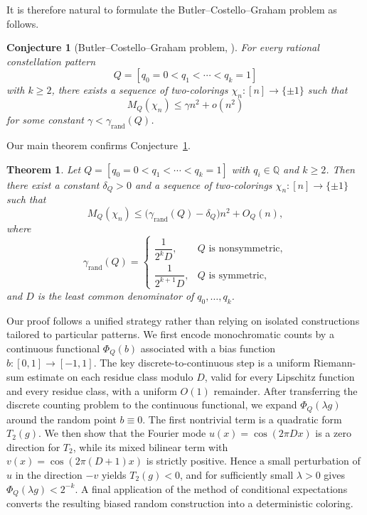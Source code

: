 \documentclass[twoside,12pt]{article}
\newcommand{\Q}{\mathbb{Q}}
\newcommand{\rand}{\mathrm{rand}}
\newcommand{\1}{\mathbf 1}
\newtheorem{theorem}{Theorem}[section]
\newtheorem{conjecture}{Conjecture}
\begin{document}
It is therefore natural to formulate the Butler--Costello--Graham problem as
follows.

\begin{conjecture}[Butler--Costello--Graham problem, \cite{BCG10}]
\label{con}
For every rational constellation pattern
\[
Q=[q_0=0<q_1<\cdots<q_k=1]
\]
with \(k\ge 2\), there exists a sequence of two-colorings
\(\chi_n:[n]\to\{\pm1\}\) such that
\[
M_Q(\chi_n)\le \gamma n^2+o(n^2)
\]
for some constant \(\gamma<\gamma_{\rand}(Q)\).
\end{conjecture}


Our main theorem confirms Conjecture~\ref{con}.

\begin{theorem}\label{thm:main}
Let \(Q=[q_0=0<q_1<\cdots<q_k=1]\) with \(q_i\in\Q\) and \(k\ge 2\).  Then
there exist a constant \(\delta_Q>0\) and a sequence of two-colorings
\(\chi_n:[n]\to\{\pm1\}\) such that
\[
M_Q(\chi_n)
\le
\bigl(\gamma_{\rand}(Q)-\delta_Q\bigr)n^2+O_Q(n),
\]
where
\[
\gamma_{\rand}(Q)=
\begin{cases}
\dfrac{1}{2^kD}, & Q \text{ is nonsymmetric},\\[8pt]
\dfrac{1}{2^{k+1}D}, & Q \text{ is symmetric},
\end{cases}
\]
and \(D\) is the least common denominator of \(q_0,\dots,q_k\).
\end{theorem}

Our proof follows a unified strategy rather than relying on isolated
constructions tailored to particular patterns.  We first encode monochromatic
counts by a continuous functional \(\Phi_Q(b)\) associated with a bias function
\(b:[0,1]\to[-1,1]\).  The key discrete-to-continuous step is a uniform
Riemann-sum estimate on each residue class modulo \(D\), valid for every
Lipschitz function and every residue class, with a uniform \(O(1)\) remainder.
After transferring the discrete counting problem to the continuous functional,
we expand \(\Phi_Q(\lambda g)\) around the random point \(b\equiv0\).  The
first nontrivial term is a quadratic form \(T_2(g)\).  We then show that the
Fourier mode \(u(x)=\cos(2\pi D x)\) is a zero direction for \(T_2\), while
its mixed bilinear term with \(v(x)=\cos(2\pi(D+1)x)\) is strictly positive.
Hence a small perturbation of \(u\) in the direction \(-v\) yields
\(T_2(g)<0\), and for sufficiently small \(\lambda>0\) gives
\(\Phi_Q(\lambda g)<2^{-k}\).  A final application of the method of conditional
expectations converts the resulting biased random construction into a
deterministic coloring.
\end{document}
